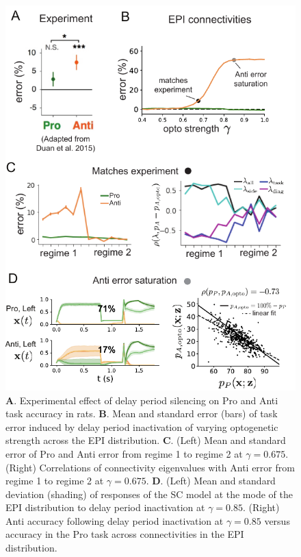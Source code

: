 \documentclass[11pt]{article}
\begin{document}
\begin{figure}
\begin{center}
\includegraphics[scale=1.]{figures/fig5/fig5.pdf}
\end{center}
\caption{ 
\textbf{A}. Experimental effect of delay period silencing on Pro and Anti task accuracy in rats.
\textbf{B}. Mean and standard error (bars) of task error induced by delay period inactivation of varying optogenetic strength across the EPI distribution.
\textbf{C}. (Left) Mean and standard error of Pro and Anti error from regime 1 to regime 2 at $\gamma = 0.675$.
(Right) Correlations of connectivity eigenvalues with Anti error from regime 1 to regime 2 at $\gamma = 0.675$.
\textbf{D}. (Left) Mean and standard deviation (shading) of responses of the SC model at the mode of the EPI distribution to delay period inactivation at $\gamma = 0.85$.  (Right) Anti accuracy following delay period inactivation at $\gamma = 0.85$ versus accuracy in the Pro task across connectivities in the EPI distribution.
}
\label{fig:SC_opto}
\end{figure}
\end{document}
